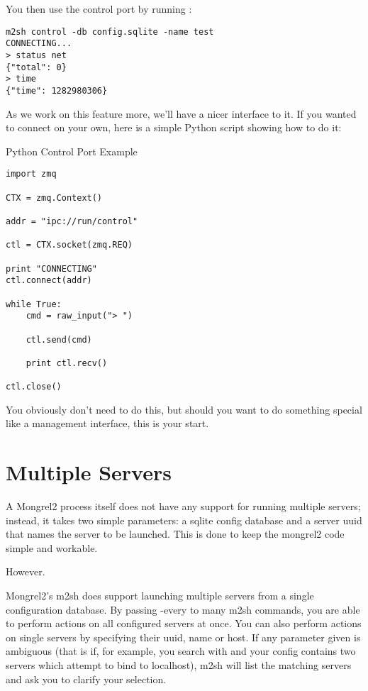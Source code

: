 You then use the control port by running :

\begin{Verbatim}
m2sh control -db config.sqlite -name test
CONNECTING...
> status net
{"total": 0}
> time
{"time": 1282980306}
\end{Verbatim}

As we work on this feature more, we'll have a nicer interface to it.
If you wanted to connect on your own, here is a simple Python
script showing how to do it:


\begin{code}{Python Control Port Example}
\begin{lstlisting}
import zmq

CTX = zmq.Context()

addr = "ipc://run/control"

ctl = CTX.socket(zmq.REQ)

print "CONNECTING"
ctl.connect(addr)

while True:
    cmd = raw_input("> ")

    ctl.send(cmd)

    print ctl.recv()

ctl.close()
\end{lstlisting}
\end{code}

You obviously don't need to do this, but should you want to do
something special like a management interface, this is your start.


\section{Multiple Servers}

A Mongrel2 process itself does not have any support for running multiple servers;
instead, it takes two simple parameters: a sqlite config database and a server uuid
that names the server to be launched. This is done to keep the mongrel2 code simple
and workable.

However.

Mongrel2's m2sh does support launching multiple servers from a single configuration
database. By passing -every to many m2sh commands, you are able to perform actions
on all configured servers at once. You can also perform actions on single servers
by specifying their uuid, name or host. If any parameter given is ambiguous (that
is if, for example, you search with  and your config contains
two servers which attempt to bind to localhost), m2sh will list the matching servers
and ask you to clarify your selection.

